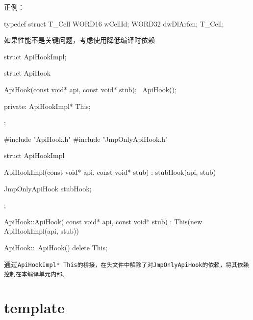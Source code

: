 \begin{content}
正例：
\begin{leftbar}
\begin{c++}
typedef struct T_Cell
{
    WORD16 wCellId;
    WORD32 dwDlArfcn;
} T_Cell;
\end{c++}
\end{leftbar}

\begin{regulation}
如果性能不是关键问题，考虑使用降低编译时依赖
\end{regulation}

\begin{leftbar}
\begin{c++}
struct ApiHookImpl;

struct ApiHook
{
    ApiHook(const void* api, const void* stub);
    ~ApiHook();

private:
    ApiHookImpl* This;
};
\end{c++}
\end{leftbar}

\begin{leftbar}
\begin{c++}
#include "ApiHook.h"
#include "JmpOnlyApiHook.h"

struct ApiHookImpl
{
   ApiHookImpl(const void* api, const void* stub)
     : stubHook(api, stub)
   {
   }

   JmpOnlyApiHook stubHook;
};

ApiHook::ApiHook( const void* api, const void* stub)
  : This(new ApiHookImpl(api, stub))
{
}

ApiHook::~ApiHook()
{
    delete This;
}
\end{c++}
\end{leftbar}

通过\tt{ApiHookImpl* This}的桥接，在头文件中解除了对\tt{JmpOnlyApiHook}的依赖，将其依赖控制在本编译单元内部。

\end{content}

\section{template}

